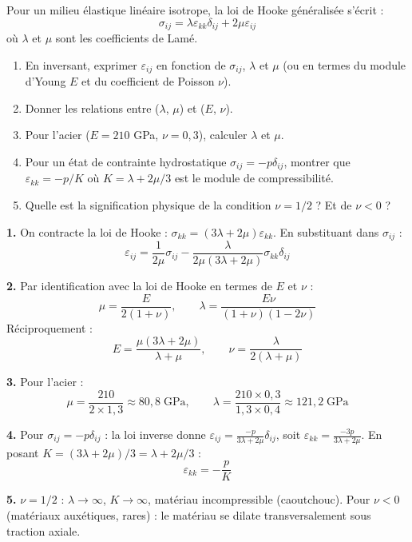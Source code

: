 \documentclass[12pt,a4paper]{article}
\begin{document}
\begin{boiteexercice}
Pour un milieu élastique linéaire isotrope, la loi de Hooke généralisée s'écrit :
\[
\sigma_{ij} = \lambda\varepsilon_{kk}\delta_{ij} + 2\mu\varepsilon_{ij}
\]
où $\lambda$ et $\mu$ sont les coefficients de Lamé.
\begin{enumerate}
  \item En inversant, exprimer $\varepsilon_{ij}$ en fonction de $\sigma_{ij}$, $\lambda$ et $\mu$ (ou en termes du module d'Young $E$ et du coefficient de Poisson $\nu$).
  \item Donner les relations entre ($\lambda$, $\mu$) et ($E$, $\nu$).
  \item Pour l'acier ($E = 210$ GPa, $\nu = 0{,}3$), calculer $\lambda$ et $\mu$.
  \item Pour un état de contrainte hydrostatique $\sigma_{ij} = -p\delta_{ij}$, montrer que $\varepsilon_{kk} = -p/K$ où $K = \lambda + 2\mu/3$ est le module de compressibilité.
  \item Quelle est la signification physique de la condition $\nu = 1/2$ ? Et de $\nu < 0$ ?
\end{enumerate}
\end{boiteexercice}

\begin{boitecorrige}
\textbf{1.} On contracte la loi de Hooke : $\sigma_{kk} = (3\lambda+2\mu)\varepsilon_{kk}$. En substituant dans $\sigma_{ij}$ :
\[
\varepsilon_{ij} = \frac{1}{2\mu}\sigma_{ij} - \frac{\lambda}{2\mu(3\lambda+2\mu)}\sigma_{kk}\delta_{ij}
\]

\textbf{2.} Par identification avec la loi de Hooke en termes de $E$ et $\nu$ :
\[
\mu = \frac{E}{2(1+\nu)}, \qquad \lambda = \frac{E\nu}{(1+\nu)(1-2\nu)}
\]
Réciproquement :
\[
E = \frac{\mu(3\lambda+2\mu)}{\lambda+\mu}, \qquad \nu = \frac{\lambda}{2(\lambda+\mu)}
\]

\textbf{3.} Pour l'acier :
\[
\mu = \frac{210}{2\times1{,}3} \approx 80{,}8\;\text{GPa}, \qquad \lambda = \frac{210\times0{,}3}{1{,}3\times0{,}4} \approx 121{,}2\;\text{GPa}
\]

\textbf{4.} Pour $\sigma_{ij} = -p\delta_{ij}$ : la loi inverse donne $\varepsilon_{ij} = \frac{-p}{3\lambda+2\mu}\delta_{ij}$, soit $\varepsilon_{kk} = \frac{-3p}{3\lambda+2\mu}$. En posant $K = (3\lambda+2\mu)/3 = \lambda+2\mu/3$ :
\[
\varepsilon_{kk} = -\frac{p}{K}
\]

\textbf{5.} $\nu=1/2$ : $\lambda\to\infty$, $K\to\infty$, matériau incompressible (caoutchouc). Pour $\nu<0$ (matériaux auxétiques, rares) : le matériau se dilate transversalement sous traction axiale.
\end{boitecorrige}
\end{document}
